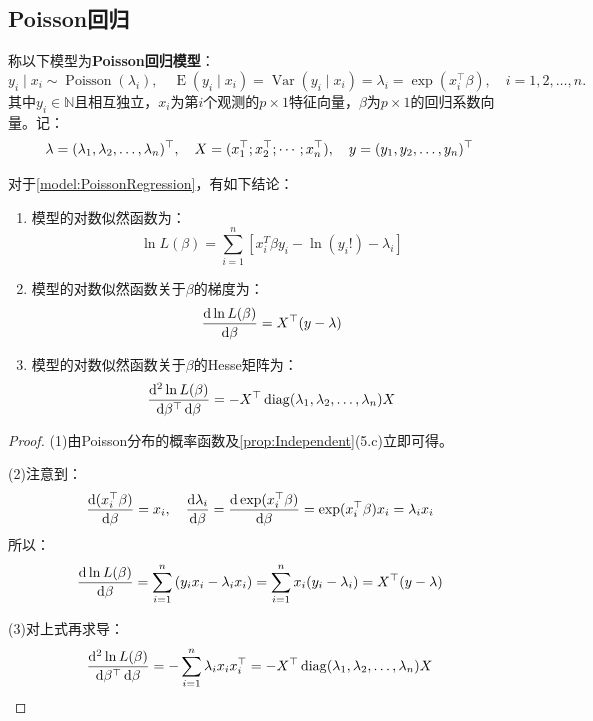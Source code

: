 \subsection{Poisson回归}
\begin{definition}\label{model:PoissonRegression}
	称以下模型为\textbf{Poisson回归模型}：
	\begin{equation*}
		y_i\mid x_i\sim\operatorname{Poisson}(\lambda_i),\quad\operatorname{E}(y_i\mid x_i)=\operatorname{Var}(y_i\mid x_i)=\lambda_i=\exp(x_i^{\top}\beta),\quad i=1,2,\dots,n.
	\end{equation*}
	其中$y_i\in\mathbb{N}$且相互独立，$x_i$为第$i$个观测的$p\times1$特征向量，$\beta$为$p\times1$的回归系数向量。记：
	\begin{equation*}
		\lambda=(\lambda_1, \lambda_2, \dots, \lambda_{n})^{\top},\quad X=(x_1^{\top};x_2^{\top};\cdots;x_n^{\top}),\quad y=(y_1, y_2, \dots, y_{n})^{\top}
	\end{equation*}
\end{definition}
\begin{property}\label{prop:PoissonRegression}
	对于\cref{model:PoissonRegression}，有如下结论：
	\begin{enumerate}
		\item 模型的对数似然函数为：
		\begin{equation*}
			\ln L(\beta)=\sum_{i=1}^{n}\left[x_i^T\beta y_i-\ln(y_i!)-\lambda_i\right]
		\end{equation*}
		\item 模型的对数似然函数关于$\beta$的梯度为：
		\begin{equation*}
			\frac{\mathop{}\!\mathrm{d}\ln L(\beta)}{\mathop{}\!\mathrm{d}\beta}=X^{\top}(y-\lambda)
		\end{equation*}
		\item 模型的对数似然函数关于$\beta$的Hesse矩阵为：
		\begin{equation*}
			\frac{\mathop{}\!\mathrm{d}^2\ln L(\beta)}{\mathop{}\!\mathrm{d}\beta^{\top}\mathop{}\!\mathrm{d}\beta}=-X^{\top}\operatorname{diag}(\lambda_1, \lambda_2, \dots, \lambda_{n})X
		\end{equation*}
	\end{enumerate}
\end{property}
\begin{proof}
	(1)由Poisson分布的概率函数及\cref{prop:Independent}(5.c)立即可得。\par
	(2)注意到：
	\begin{equation*}
		\frac{\mathop{}\!\mathrm{d}(x_i^{\top}\beta)}{\mathop{}\!\mathrm{d}\beta}=x_i,\quad\frac{\mathop{}\!\mathrm{d}\lambda_i}{\mathop{}\!\mathrm{d}\beta}=\frac{\mathop{}\!\mathrm{d}\exp(x_i^{\top}\beta)}{\mathop{}\!\mathrm{d}\beta}=\exp(x_i^{\top}\beta)x_i=\lambda_ix_i
	\end{equation*}
	所以：
	\begin{align*}
		\frac{\mathop{}\!\mathrm{d}\ln L(\beta)}{\mathop{}\!\mathrm{d}\beta}=\sum_{i=1}^{n}\left(y_ix_i-\lambda_ix_i\right)=\sum_{i=1}^{n}x_i(y_i-\lambda_i)=X^{\top}(y-\lambda)
	\end{align*}\par
	(3)对上式再求导：
	\begin{equation*}
		\frac{\mathop{}\!\mathrm{d}^2\ln L(\beta)}{\mathop{}\!\mathrm{d}\beta^{\top}\mathop{}\!\mathrm{d}\beta}=-\sum_{i=1}^{n}\lambda_ix_ix_i^{\top}=-X^{\top}\operatorname{diag}(\lambda_1, \lambda_2, \dots, \lambda_{n})X\qedhere
	\end{equation*}
\end{proof}

